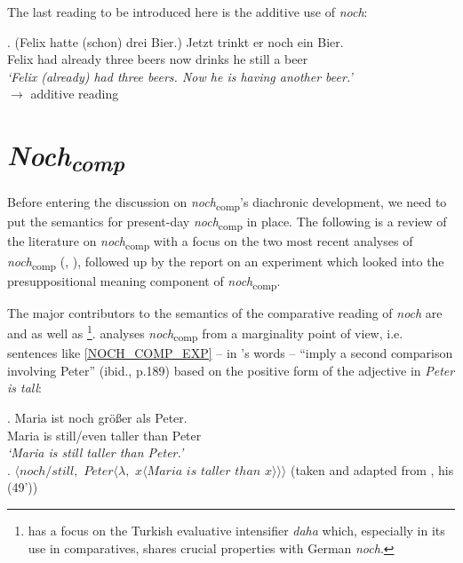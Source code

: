 \documentclass[output=paper,
modfonts
]{langscibook}
\begin{document}
The last reading to be introduced here is the additive use of \textit{noch}:

\exg. (Felix hatte (schon) drei Bier.) Jetzt trinkt er noch ein Bier.\\
Felix had already three beers now drinks he still a beer\\
\textit{`Felix (already) had three beers. Now he is having another beer.'} \\ \hfill $\rightarrow$ additive reading \label{NOCH_ADD_EXP}


\section{\textit{Noch\textsubscript{comp}}}\label{sec_noch-comp_gen}

Before entering the discussion on \textit{noch}\textsubscript{comp}'s diachronic development, we need to put the semantics for present-day \textit{noch}\textsubscript{comp} in place. The following is a review of the literature on \textit{noch}\textsubscript{comp} with a focus on the two most recent analyses of \textit{noch}\textsubscript{comp} (\citet{umbach2009a_comp}, \citet{Hofstetter2013}), followed up by the report on an experiment which looked into the presuppositional meaning component of \textit{noch}\textsubscript{comp}.

The major contributors to the semantics of the comparative reading of \textit{noch} are \citet{koenig1977} and \citet{umbach2009a_comp} as well as \citet{Hofstetter2013}\footnote{ \citet{Hofstetter2013} has a focus on the Turkish evaluative intensifier \textit{daha} which, especially in its use in comparatives, shares crucial properties with German \textit{noch}.}. \citet{koenig1977} analyses \textit{noch}\textsubscript{comp} from a marginality point of view, i.e. sentences like \ref{NOCH_COMP_EXP} -- in \citeauthor{koenig1977}'s words -- ``imply a second comparison involving Peter'' (ibid., p.189) based on the positive form of the adjective in \textit{Peter is tall}:

\exg. Maria ist noch größer als Peter.\\
Maria is still/even taller than Peter\\
\textit{`Maria is still taller than Peter.'} \label{NOCH_COMP_EXP}\\

\ex. $\langle noch/still,$ $Peter\langle\lambda,$ $x\langle Maria$ $is$ $taller$ $than$ $x\rangle\rangle\rangle$ \label{koenigs_noch_comp} \flushright (taken and adapted from \citet{koenig1977}, his (49'))
\end{document}
